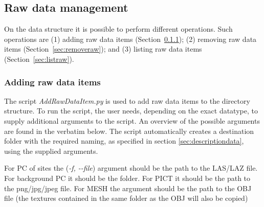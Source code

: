 \subsection{Raw data management}
On the data structure it is possible to perform different operations. Such operations
are (1) adding raw data items (Section~\ref{sec:addraw}); (2) removing raw data
items (Section~\ref{sec:removeraw}); and (3) listing raw data items (Section~\ref{sec:listraw}).

\subsubsection{Adding raw data items}
\label{sec:addraw} 
The script \textit{AddRawDataItem.py} is used to add raw data items to the directory
structure. To run the script, the user needs, depending on the exact datatype,
to supply additional arguments to the script. An overview of the possible arguments
are found in the verbatim below. The script automatically creates a destination
folder with the required naming, as specified in section \ref{sec:descriptiondata},
using the supplied arguments.

For PC of sites the (\textit{-f, -\hspace{0cm}-file}) argument should be the path 
to the LAS/LAZ file. For background PC it should be the folder. 
For PICT it should be the path to the png/jpg/jpeg file. 
For MESH the argument should be the path to the OBJ file (the textures contained in the same folder as the OBJ will also be copied)

